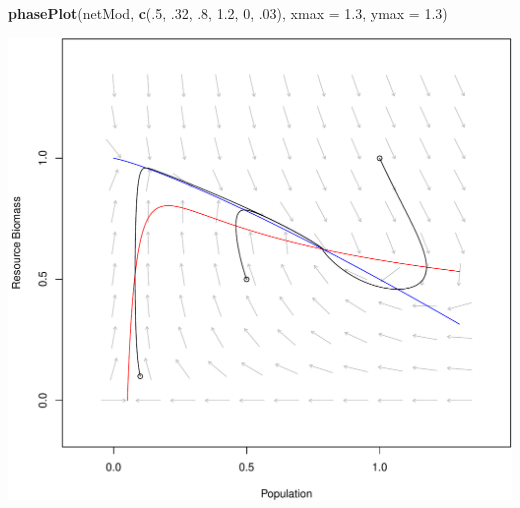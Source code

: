 \documentclass[]{article}
\newenvironment{Shaded}{\begin{snugshade}}{\end{snugshade}}
\newcommand{\KeywordTok}[1]{\textcolor[rgb]{0.13,0.29,0.53}{\textbf{{#1}}}}
\newcommand{\DataTypeTok}[1]{\textcolor[rgb]{0.13,0.29,0.53}{{#1}}}
\newcommand{\DecValTok}[1]{\textcolor[rgb]{0.00,0.00,0.81}{{#1}}}
\newcommand{\FloatTok}[1]{\textcolor[rgb]{0.00,0.00,0.81}{{#1}}}
\newcommand{\NormalTok}[1]{{#1}}
\begin{document}
\begin{Shaded}
\begin{Highlighting}[]
\KeywordTok{phasePlot}\NormalTok{(netMod, }\KeywordTok{c}\NormalTok{(.}\DecValTok{5}\NormalTok{, .}\DecValTok{32}\NormalTok{, .}\DecValTok{8}\NormalTok{, }\FloatTok{1.2}\NormalTok{, }\DecValTok{0}\NormalTok{, .}\DecValTok{03}\NormalTok{), }\DataTypeTok{xmax =} \FloatTok{1.3}\NormalTok{, }\DataTypeTok{ymax =} \FloatTok{1.3}\NormalTok{)}
\end{Highlighting}
\end{Shaded}

\includegraphics{consumerresource_files/figure-latex/unnamed-chunk-12-1.pdf}
\end{document}
